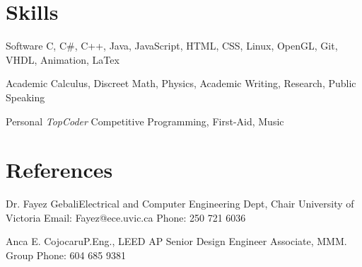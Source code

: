 \documentclass{tccv}
\begin{document}
\section{Skills}

\begin{factlist}

\item{Software}
     {C, C\#, C++, Java, JavaScript, HTML, CSS, Linux, OpenGL, Git, VHDL, Animation, LaTex}

\item{Academic}
     {Calculus, Discreet Math, Physics, Academic Writing, Research, Public Speaking}

\item{Personal}
     {\textit{TopCoder} Competitive Programming, First-Aid, Music}

\end{factlist}

\section{References}

\begin{factlist}
	\item{Dr. Fayez Gebali}{Electrical and Computer Engineering Dept, Chair
		University of Victoria
		Email: Fayez@ece.uvic.ca
		Phone: 250 721 6036}
	\item{Anca E. Cojocaru}{P.Eng., LEED AP
		Senior Design Engineer
		Associate, MMM. Group
		Phone: 604 685 9381}
\end{factlist}
\end{document}
